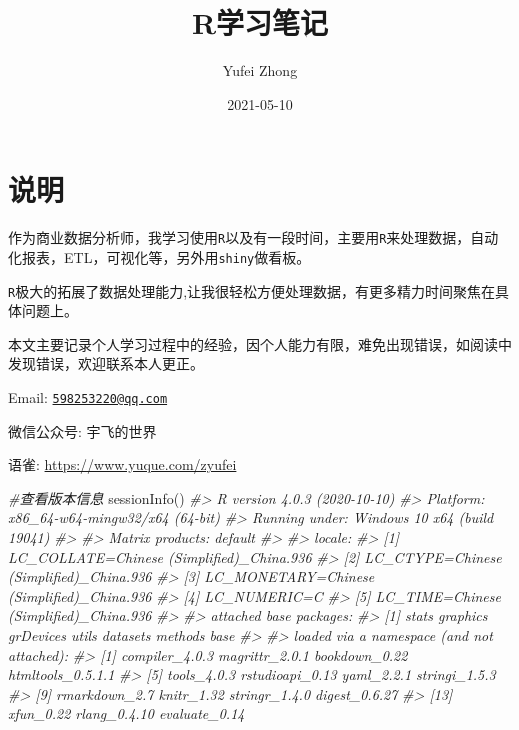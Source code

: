 \documentclass[
]{book}
\title{R学习笔记}
\author{Yufei Zhong}
\date{2021-05-10}
\newenvironment{Shaded}{\begin{snugshade}}{\end{snugshade}}
\newcommand{\CommentTok}[1]{\textcolor[rgb]{0.56,0.35,0.01}{\textit{#1}}}
\newcommand{\FunctionTok}[1]{\textcolor[rgb]{0.00,0.00,0.00}{#1}}
\newcommand{\NormalTok}[1]{#1}
\begin{document}
\maketitle

{
\setcounter{tocdepth}{1}
\tableofcontents
}
\hypertarget{ux8bf4ux660e}{%
\chapter{说明}\label{ux8bf4ux660e}}

作为商业数据分析师，我学习使用\texttt{R}以及有一段时间，主要用\texttt{R}来处理数据，自动化报表，ETL，可视化等，另外用\texttt{shiny}做看板。

\texttt{R}极大的拓展了数据处理能力,让我很轻松方便处理数据，有更多精力时间聚焦在具体问题上。

本文主要记录个人学习过程中的经验，因个人能力有限，难免出现错误，如阅读中发现错误，欢迎联系本人更正。

Email: \href{mailto:598253220@qq.com}{\nolinkurl{598253220@qq.com}}

微信公众号: 宇飞的世界

语雀: \url{https://www.yuque.com/zyufei}

\begin{Shaded}
\begin{Highlighting}[]
\CommentTok{\#查看版本信息}
\FunctionTok{sessionInfo}\NormalTok{()}
\CommentTok{\#\textgreater{} R version 4.0.3 (2020{-}10{-}10)}
\CommentTok{\#\textgreater{} Platform: x86\_64{-}w64{-}mingw32/x64 (64{-}bit)}
\CommentTok{\#\textgreater{} Running under: Windows 10 x64 (build 19041)}
\CommentTok{\#\textgreater{} }
\CommentTok{\#\textgreater{} Matrix products: default}
\CommentTok{\#\textgreater{} }
\CommentTok{\#\textgreater{} locale:}
\CommentTok{\#\textgreater{} [1] LC\_COLLATE=Chinese (Simplified)\_China.936 }
\CommentTok{\#\textgreater{} [2] LC\_CTYPE=Chinese (Simplified)\_China.936   }
\CommentTok{\#\textgreater{} [3] LC\_MONETARY=Chinese (Simplified)\_China.936}
\CommentTok{\#\textgreater{} [4] LC\_NUMERIC=C                              }
\CommentTok{\#\textgreater{} [5] LC\_TIME=Chinese (Simplified)\_China.936    }
\CommentTok{\#\textgreater{} }
\CommentTok{\#\textgreater{} attached base packages:}
\CommentTok{\#\textgreater{} [1] stats     graphics  grDevices utils     datasets  methods   base     }
\CommentTok{\#\textgreater{} }
\CommentTok{\#\textgreater{} loaded via a namespace (and not attached):}
\CommentTok{\#\textgreater{}  [1] compiler\_4.0.3    magrittr\_2.0.1    bookdown\_0.22     htmltools\_0.5.1.1}
\CommentTok{\#\textgreater{}  [5] tools\_4.0.3       rstudioapi\_0.13   yaml\_2.2.1        stringi\_1.5.3    }
\CommentTok{\#\textgreater{}  [9] rmarkdown\_2.7     knitr\_1.32        stringr\_1.4.0     digest\_0.6.27    }
\CommentTok{\#\textgreater{} [13] xfun\_0.22         rlang\_0.4.10      evaluate\_0.14}
\end{Highlighting}
\end{Shaded}
\end{document}
